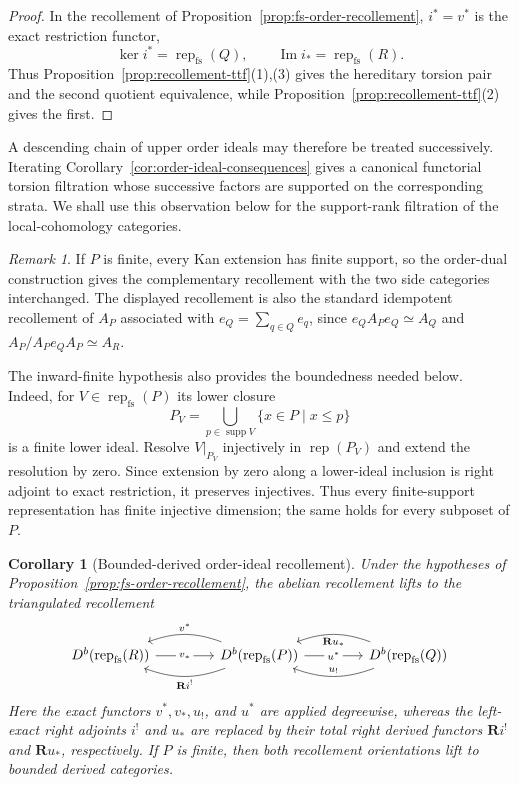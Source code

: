 \documentclass[12pt,reqno]{amsart}
\newtheorem{corollary}[theorem]{Corollary}
\theoremstyle{definition}
\theoremstyle{remark}
\newtheorem{remark}[theorem]{Remark}
\newcommand{\Rep}{\operatorname{rep}}
\begin{document}
\begin{proof}
In the recollement of Proposition~\ref{prop:fs-order-recollement},
$i^*=v^*$ is the exact restriction functor,
\[
\ker i^*=\Rep_{\mathrm{fs}}(Q),
\qquad
\operatorname{Im}i_*=\Rep_{\mathrm{fs}}(R).
\]
Thus Proposition~\ref{prop:recollement-ttf}(1),(3) gives the hereditary
torsion pair and the second quotient equivalence, while
Proposition~\ref{prop:recollement-ttf}(2) gives the first.
\end{proof}


A descending chain of upper order ideals may therefore be treated
successively.  Iterating Corollary~\ref{cor:order-ideal-consequences} gives a
canonical functorial torsion filtration whose successive factors are supported
on the corresponding strata.  We shall use this observation below for the
support-rank filtration of the local-cohomology categories.

\begin{remark}\label{rem:finite-complementary-recollements}
If $P$ is finite, every Kan extension has finite support, so the order-dual
construction gives the complementary recollement with the two side categories
interchanged.  The displayed recollement is also the standard idempotent
recollement of $A_P$ associated with $e_Q=\sum_{q\in Q}e_q$, since
$e_QA_Pe_Q\simeq A_Q$ and $A_P/A_Pe_QA_P\simeq A_R$.
\end{remark}

The inward-finite hypothesis also provides the boundedness needed below.
Indeed, for $V\in\Rep_{\mathrm{fs}}(P)$ its lower closure
\[
P_V=\bigcup_{p\in\operatorname{supp}V}\{x\in P\mid x\le p\}
\]
is a finite lower ideal.  Resolve $V|_{P_V}$ injectively in $\Rep(P_V)$ and
extend the resolution by zero.  Since extension by zero along a lower-ideal
inclusion is right adjoint to exact restriction, it preserves injectives.
Thus every finite-support representation has finite injective dimension; the
same holds for every subposet of $P$.

\begin{corollary}[Bounded-derived order-ideal recollement]
\label{cor:fs-derived-recollement}
Under the hypotheses of Proposition~\ref{prop:fs-order-recollement}, the
abelian recollement lifts to the triangulated recollement
\[
\begin{tikzcd}[column sep=4.2em]
D^b\!\left(\Rep_{\mathrm{fs}}(R)\right)
  \arrow[r, "v_*" description]
& D^b\!\left(\Rep_{\mathrm{fs}}(P)\right)
  \arrow[l, bend right=20, "v^*"']
  \arrow[l, bend left=20, "\mathbf R i^!"]
  \arrow[r, "u^*" description]
& D^b\!\left(\Rep_{\mathrm{fs}}(Q)\right)
  \arrow[l, bend left=20, "u_!"']
  \arrow[l, bend right=20, "\mathbf R u_*"]
\end{tikzcd}
\]
Here the exact functors $v^*,v_*,u_!$, and $u^*$ are applied degreewise,
whereas the left-exact right adjoints $i^!$ and $u_*$ are replaced by their
total right derived functors $\mathbf R i^!$ and $\mathbf R u_*$,
respectively.  If $P$ is finite, then both recollement orientations lift to
bounded derived categories.
\end{corollary}
\end{document}
